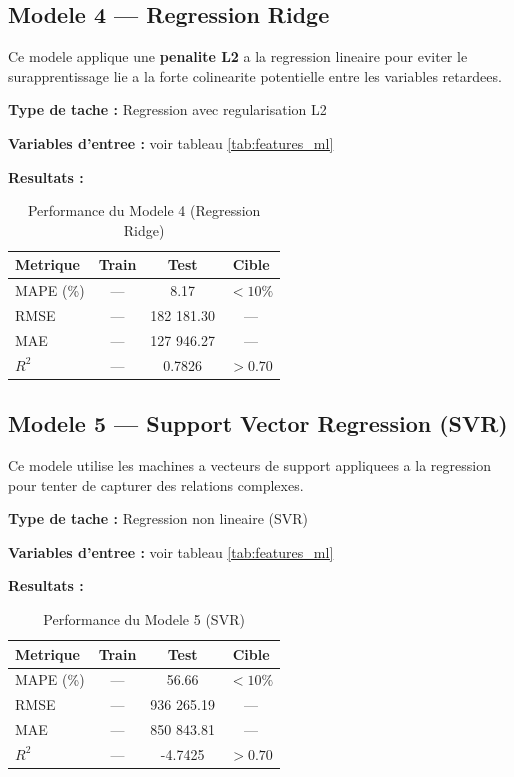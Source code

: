 \documentclass[12pt,a4paper]{report}
\begin{document}
\begin{itemize}[leftmargin=1.5em]
\subsection{Modele 4 --- Regression Ridge}

Ce modele applique une \textbf{penalite L2} a la regression lineaire pour eviter le surapprentissage lie a la forte colinearite potentielle entre les variables retardees.

\textbf{Type de tache :} Regression avec regularisation L2

\textbf{Variables d'entree :} voir tableau \ref{tab:features_ml}

\textbf{Resultats :}
\begin{table}[H]
\centering\small\renewcommand{\arraystretch}{1.3}
\begin{tabular}{lccc}
\toprule
\textbf{Metrique} & \textbf{Train} & \textbf{Test} & \textbf{Cible} \\
\midrule
MAPE (\%) & --- & 8.17 & $< 10\%$ \\
RMSE      & --- & 182 181.30 & --- \\
MAE       & --- & 127 946.27 & --- \\
$R^2$     & --- & 0.7826 & $> 0.70$ \\
\bottomrule
\end{tabular}
\caption{Performance du Modele 4 (Regression Ridge)}
\end{table}

\subsection{Modele 5 --- Support Vector Regression (SVR)}

Ce modele utilise les machines a vecteurs de support appliquees a la regression pour tenter de capturer des relations complexes.

\textbf{Type de tache :} Regression non lineaire (SVR)

\textbf{Variables d'entree :} voir tableau \ref{tab:features_ml}

\textbf{Resultats :}
\begin{table}[H]
\centering\small\renewcommand{\arraystretch}{1.3}
\begin{tabular}{lccc}
\toprule
\textbf{Metrique} & \textbf{Train} & \textbf{Test} & \textbf{Cible} \\
\midrule
MAPE (\%) & --- & 56.66 & $< 10\%$ \\
RMSE      & --- & 936 265.19 & --- \\
MAE       & --- & 850 843.81 & --- \\
$R^2$     & --- & -4.7425 & $> 0.70$ \\
\bottomrule
\end{tabular}
\caption{Performance du Modele 5 (SVR)}
\end{table}


\end{itemize}
\end{document}
